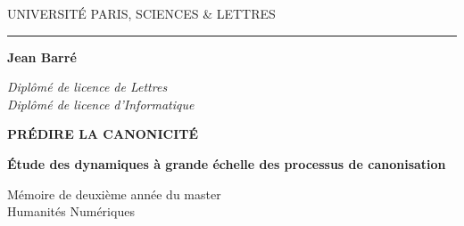 \begin{titlepage}
\begin{center}

\bigskip

\begin{large}
UNIVERSITÉ PARIS, SCIENCES \& LETTRES
\end{large}

\begin{center}\rule{2cm}{0.02cm}\end{center}

\bigskip
\bigskip
\bigskip
\begin{Large}
\textbf{Jean Barré}\\
\end{Large}
\begin{normalsize}
\textit{Diplômé de licence de Lettres}\\
\textit{Diplômé de licence d'Informatique}\\
\end{normalsize}

\bigskip
\bigskip
\bigskip

\begin{Huge}
\textbf{PRÉDIRE LA CANONICITÉ}\\
\end{Huge}

\bigskip
\bigskip
\begin{LARGE}
\textbf{Étude des dynamiques à grande échelle des
processus de canonisation}\\
\end{LARGE}

\bigskip
\bigskip
\bigskip
\vfill

\begin{large}
Mémoire de deuxième année du master\\
\og Humanités Numériques \fg{} \\
\end{large}

\end{center}
\end{titlepage}
